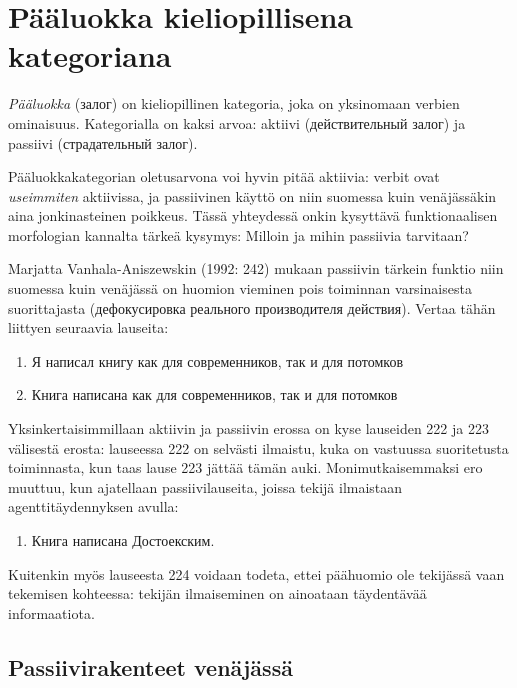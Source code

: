 \documentclass[]{scrreprt}
\providecommand{\tightlist}{%
  \setlength{\itemsep}{0pt}\setlength{\parskip}{0pt}}
\begin{document}
\chapter{Pääluokka kieliopillisena
kategoriana}\label{luento-14-puxe4uxe4luokka-kieliopillisena-kategoriana}


\emph{Pääluokka} (залог) on kieliopillinen kategoria, joka on yksinomaan
verbien ominaisuus. Kategorialla on kaksi arvoa: aktiivi (действительный
залог) ja passiivi (страдательный залог).

Pääluokkakategorian oletusarvona voi hyvin pitää aktiivia: verbit ovat
\emph{useimmiten} aktiivissa, ja passiivinen käyttö on niin suomessa
kuin venäjässäkin aina jonkinasteinen poikkeus. Tässä yhteydessä onkin
kysyttävä funktionaalisen morfologian kannalta tärkeä kysymys: Milloin
ja mihin passiivia tarvitaan?

Marjatta Vanhala-Aniszewskin (1992: 242) mukaan passiivin tärkein
funktio niin suomessa kuin venäjässä on huomion vieminen pois toiminnan
varsinaisesta suorittajasta (дефокусировка реального производителя
действия). Vertaa tähän liittyen seuraavia lauseita:

\begin{enumerate}
\def\labelenumi{(\arabic{enumi})}
\setcounter{enumi}{221}
\tightlist
\item
  Я написал книгу как для современников, так и для потомков
\item
  Книга написана как для современников, так и для потомков
\end{enumerate}

Yksinkertaisimmillaan aktiivin ja passiivin erossa on kyse lauseiden 222
ja 223 välisestä erosta: lauseessa 222 on selvästi ilmaistu, kuka on
vastuussa suoritetusta toiminnasta, kun taas lause 223 jättää tämän
auki. Monimutkaisemmaksi ero muuttuu, kun ajatellaan passiivilauseita,
joissa tekijä ilmaistaan agenttitäydennyksen avulla:

\begin{enumerate}
\def\labelenumi{(\arabic{enumi})}
\setcounter{enumi}{223}
\tightlist
\item
  Книга написана Достоекским.
\end{enumerate}

Kuitenkin myös lauseesta 224 voidaan todeta, ettei päähuomio ole
tekijässä vaan tekemisen kohteessa: tekijän ilmaiseminen on ainoataan
täydentävää informaatiota.

\section{Passiivirakenteet
venäjässä}\label{passiivirakenteet-venuxe4juxe4ssuxe4}
\end{document}
